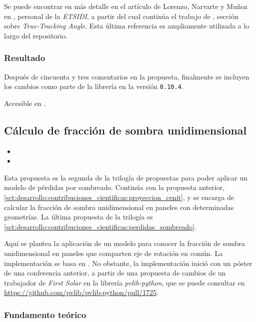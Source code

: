 Se puede encontrar en más detalle en el artículo de Lorenzo, Narvarte y Muñoz en \cite{Lorenzo_Narvarte_Muñoz_2011}, personal de la \textit{ETSIDI}, a partir del cual continúa el trabajo de \cite{Anderson_Mikofski_2020}, sección sobre \textit{True-Tracking Angle}. Esta última referencia es ampliamente utilizada a lo largo del repositorio.

\subsubsection{Resultado}

Después de cincuenta y tres comentarios en la propuesta, finalmente se incluyen los cambios como parte de la librería en la versión \texttt{0.10.4}.

Accesible en .

\subsection{Cálculo de fracción de sombra unidimensional} \label{sct:desarrollo:contribuciones_cientificas:fraccion_sombra}

\begin{itemize}
    \item {}
    \item {}
\end{itemize}

Esta propuesta es la segunda de la trilogía de propuestas para poder aplicar un modelo de pérdidas por sombreado. Continúa con la propuesta anterior, \ref{sct:desarrollo:contribuciones_cientificas:proyeccion_cenit}, y se encarga de calcular la fracción de sombra unidimensional en paneles con determinadas geometrías. La última propuesta de la trilogía es \ref{sct:desarrollo:contribuciones_cientificas:perdidas_sombreado}.

Aquí se plantea la aplicación de un modelo para conocer la fracción de sombra unidimensional en paneles que comparten eje de rotación en común. La implementación se basa en \cite{Anderson_Jensen_2024}. No obstante, la implementación inició con un póster de una conferencia anterior, a partir de una propuesta de cambios de un trabajador de \textit{First Solar} en la librería \textit{pvlib-python}, que se puede consultar en \url{https://github.com/pvlib/pvlib-python/pull/1725}.

\subsubsection{Fundamento teórico}

